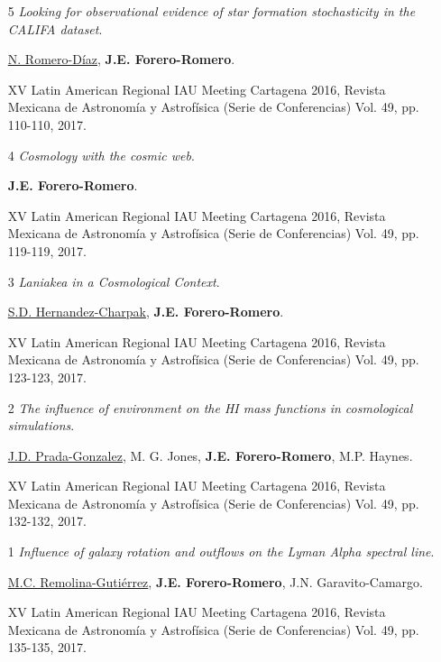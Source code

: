 \documentclass{article}
\begin{document}
\begin{itemize}

\item[5]{\it Looking for observational evidence of star formation
  stochasticity in the CALIFA dataset}.
	
\underline{N. Romero-Díaz},  {\bf J.E. Forero-Romero}.

XV Latin American Regional IAU Meeting Cartagena 2016, Revista Mexicana
de Astronomía y Astrofísica (Serie de Conferencias) Vol. 49,
pp. 110-110, 2017.

\item[4]{\it Cosmology with the cosmic web}.

{\bf J.E. Forero-Romero}.

XV Latin American Regional IAU Meeting Cartagena 2016, Revista Mexicana
de Astronomía y Astrofísica (Serie de Conferencias) Vol. 49,
pp. 119-119, 2017.

\item[3]{\it Laniakea in a Cosmological Context}.


\underline{S.D. Hernandez-Charpak}, {\bf J.E. Forero-Romero}.

XV Latin American Regional IAU Meeting Cartagena 2016, Revista Mexicana
de Astronomía y Astrofísica (Serie de Conferencias) Vol. 49,
pp. 123-123, 2017.


\item[2] {\it The influence of environment on the HI mass functions in
  cosmological simulations}.
 
\underline{J.D. Prada-Gonzalez}, M. G. Jones, {\bf J.E. Forero-Romero}, M.P. Haynes.

XV Latin American Regional IAU Meeting Cartagena 2016, Revista Mexicana
de Astronomía y Astrofísica (Serie de Conferencias) Vol. 49,
pp. 132-132, 2017.

\item [1] {\it Influence of galaxy rotation and outflows on the Lyman
  Alpha spectral line}. 
	
\underline{M.C. Remolina-Gutiérrez}, {\bf J.E. Forero-Romero},
J.N. Garavito-Camargo.

XV Latin American Regional IAU Meeting Cartagena 2016, Revista Mexicana
de Astronomía y Astrofísica (Serie de Conferencias) Vol. 49,
pp. 135-135, 2017.
\end{itemize}
\newpage
\end{document}
